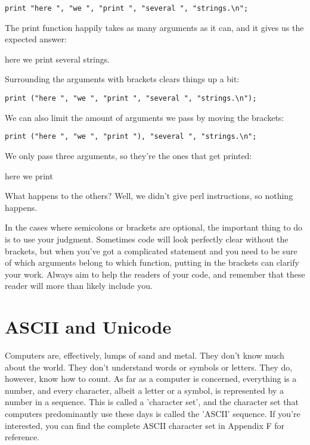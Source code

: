 \documentclass[a4paper,11pt]{book}
\begin{document}
\noindent 

\noindent \texttt{print "here ", "we ", "print ", "several ", "strings.\textbackslash n";}

\noindent 

\noindent The print function happily takes as many arguments as it can, and it gives us the expected answer:

\noindent 

\noindent here we print several strings.

\noindent 

\noindent Surrounding the arguments with brackets clears things up a bit:

\noindent 

\noindent \texttt{print ("here ", "we ", "print ", "several ", "strings.\textbackslash n");}

\noindent 

\noindent We can also limit the amount of arguments we pass by moving the brackets:

\noindent 

\noindent \texttt{print ("here ", "we ", "print "), "several ", "strings.\textbackslash n";}

\noindent 

\noindent We only pass three arguments, so they're the ones that get printed:

\noindent 

\noindent here we print

\noindent 

\noindent What happens to the others? Well, we didn't give perl instructions, so nothing happens.

\noindent 

\noindent In the cases where semicolons or brackets are optional, the important thing to do is to use your judgment. Sometimes code will look perfectly clear without the brackets, but when you've got a complicated statement and you need to be sure of which arguments belong to which function, putting in the brackets can clarify your work. Always aim to help the readers of your code, and remember that these reader will more than likely include you.

\noindent 

\section{ASCII and Unicode}

\noindent 

\noindent Computers are, effectively, lumps of sand and metal. They don't know much about the world. They don't understand words or symbols or letters. They do, however, know how to count. As far as a computer is concerned, everything is a number, and every character, albeit a letter or a symbol, is represented by a number in a sequence. This is called a 'character set', and the character set that computers predominantly use these days is called the 'ASCII' sequence. If you're interested, you can find the complete ASCII character set in Appendix F for reference.
\end{document}
